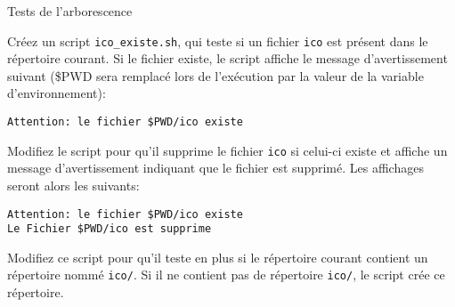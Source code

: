 \begin{exercice}
  \begin{exercicelet}{Tests de l'arborescence}
    \begin{questions}
    \item Créez un script \texttt{ico\_existe.sh}, qui teste si un fichier \texttt{ico} est présent dans le répertoire courant. Si le fichier existe, le script affiche le message d'avertissement suivant (\$PWD sera remplacé lors de l'exécution par la valeur de la variable d'environnement):
      \begin{minipage}[c]{5cm}
\begin{verbatim}
Attention: le fichier $PWD/ico existe
\end{verbatim}
      \end{minipage}
      
      
    \item Modifiez le script pour qu’il supprime le fichier \texttt{ico} si celui-ci existe et affiche un message d'avertissement indiquant que le fichier est supprimé. Les affichages seront alors les suivants:
      \begin{minipage}[c]{5cm}
\begin{verbatim}
Attention: le fichier $PWD/ico existe
Le Fichier $PWD/ico est supprime
\end{verbatim}
      \end{minipage}
    \item Modifiez ce script pour qu'il teste en plus si le répertoire courant contient un répertoire nommé \texttt{ico/}. Si il ne contient pas de répertoire \texttt{ico/}, le script crée ce répertoire.
    \end{questions}
  \end{exercicelet}
\end{exercice}

